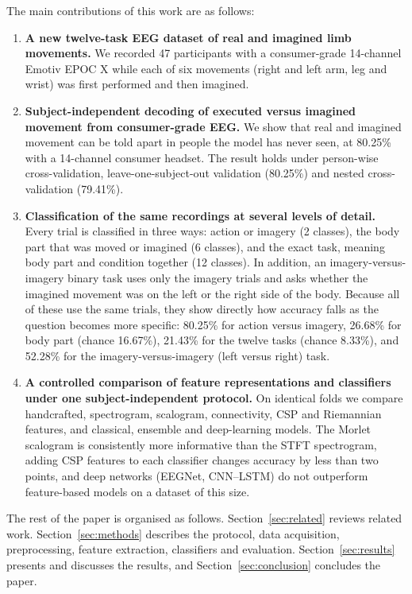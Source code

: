 \documentclass[pdflatex,sn-mathphys-num]{sn-jnl}%
\theoremstyle{thmstyleone}%
\theoremstyle{thmstyletwo}%
\theoremstyle{thmstylethree}%
\begin{document}
The main contributions of this work are as follows:

\begin{enumerate}
\item \textbf{A new twelve-task EEG dataset of real and imagined limb movements.} We recorded 47 participants with a consumer-grade 14-channel Emotiv EPOC X while each of six movements (right and left arm, leg and wrist) was first performed and then imagined.

\item \textbf{Subject-independent decoding of executed versus imagined movement from consumer-grade EEG.} We show that real and imagined movement can be told apart in people the model has never seen, at 80.25\% with a 14-channel consumer headset. The result holds under person-wise cross-validation, leave-one-subject-out validation (80.25\%) and nested cross-validation (79.41\%).

\item \textbf{Classification of the same recordings at several levels of detail.} Every trial is classified in three ways: action or imagery (2 classes), the body part that was moved or imagined (6 classes), and the exact task, meaning body part and condition together (12 classes). In addition, an imagery-versus-imagery binary task uses only the imagery trials and asks whether the imagined movement was on the left or the right side of the body. Because all of these use the same trials, they show directly how accuracy falls as the question becomes more specific: 80.25\% for action versus imagery, 26.68\% for body part (chance 16.67\%), 21.43\% for the twelve tasks (chance 8.33\%), and 52.28\% for the imagery-versus-imagery (left versus right) task.

\item \textbf{A controlled comparison of feature representations and classifiers under one subject-independent protocol.} On identical folds we compare handcrafted, spectrogram, scalogram, connectivity, CSP and Riemannian features, and classical, ensemble and deep-learning models. The Morlet scalogram is consistently more informative than the STFT spectrogram, adding CSP features to each classifier changes accuracy by less than two points, and deep networks (EEGNet, CNN--LSTM) do not outperform feature-based models on a dataset of this size.
\end{enumerate}

The rest of the paper is organised as follows. Section~\ref{sec:related} reviews related work. Section~\ref{sec:methods} describes the protocol, data acquisition, preprocessing, feature extraction, classifiers and evaluation. Section~\ref{sec:results} presents and discusses the results, and Section~\ref{sec:conclusion} concludes the paper.
\end{document}
